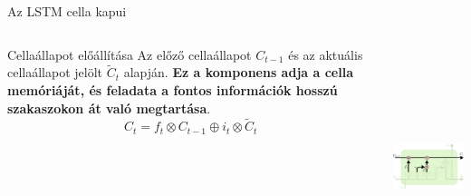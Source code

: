 \documentclass[english, aspectratio=169]{beamer}
\begin{document}
\begin{frame}{Az LSTM cella kapui}
\begin{columns}
\begin{column}{.5\textwidth}
\begin{block}{Cellaállapot előállítása}
Az előző cellaállapot $C_{t-1}$ és az aktuális cellaállapot jelölt $\tilde{C}_t$ alapján. \textbf{Ez a komponens adja a cella memóriáját, és feladata a fontos információk hosszú szakaszokon át való megtartása}. 
\[
C_t = f_t \otimes C_{t-1} \oplus i_t \otimes \tilde{C}_t
\]
\end{block}
\end{column}
\begin{column}{.5\textwidth}
\begin{center}
\includegraphics[width=7cm, height=7cm, keepaspectratio]{images/recurrent_11.png}
\end{center}
\end{column}
\end{columns}
\end{frame}
\end{document}
